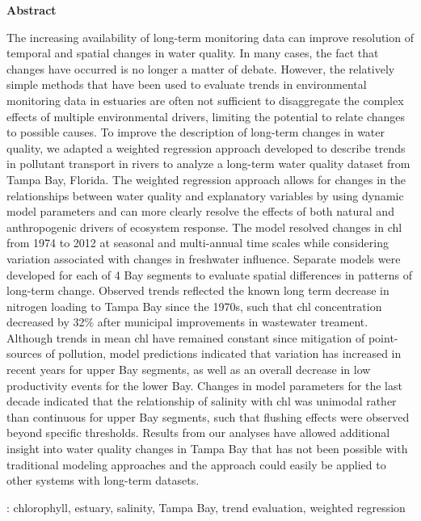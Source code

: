 \documentclass[letterpaper,12pt,oneside]{article}\usepackage[]{graphicx}\usepackage[]{color}
\begin{document}
\centerline{{\bf Abstract}}
\begin{singlespace} \small
\noindent The increasing availability of long-term monitoring data can improve resolution of temporal and spatial changes in water quality.  In many cases, the fact that changes have occurred is no longer a matter of debate.  However, the relatively simple methods that have been used to evaluate trends in environmental monitoring data in estuaries are often not sufficient to disaggregate the complex effects of multiple environmental drivers, limiting the potential to relate changes to possible causes.  To improve the description of long-term changes in water quality, we adapted a weighted regression approach developed to describe trends in pollutant transport in rivers to analyze a long-term water quality dataset from Tampa Bay, Florida.  The weighted regression approach allows for changes in the relationships between water quality and explanatory variables by using dynamic model parameters and can more clearly resolve the effects of both natural and anthropogenic drivers of ecosystem response.  The model resolved changes in \ac{chl} from 1974 to 2012 at seasonal and multi-annual time scales while considering variation associated with changes in freshwater influence.  Separate models were developed for each of 4 Bay segments to evaluate spatial differences in patterns of long-term change.  Observed trends reflected the known long term decrease in nitrogen loading to Tampa Bay since the 1970s, such that \ac{chl} concentration decreased by 32\% after municipal improvements in wastewater treament. Although trends in mean \ac{chl} have remained constant since mitigation of point-sources of pollution, model predictions indicated that variation has increased in recent years for upper Bay segments, as well as an overall decrease in low productivity events for the lower Bay. Changes in model parameters for the last decade indicated that the relationship of salinity with \ac{chl} was unimodal rather than continuous for upper Bay segments, such that flushing effects were observed beyond specific thresholds.  Results from our analyses have allowed additional insight into water quality changes in Tampa Bay that has not been possible with traditional modeling approaches and the approach could easily be applied to other systems with long-term datasets. \normalsize
\end{singlespace}
: chlorophyll, estuary, salinity, Tampa Bay, trend evaluation, weighted regression

\acresetall
\clearpage
\end{document}
